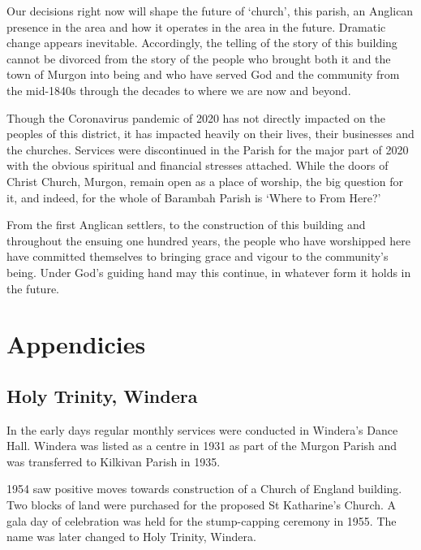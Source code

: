 Our decisions right now will shape the future of `church', this parish, an Anglican presence in the area and how it operates in the area in the future. Dramatic change appears inevitable. Accordingly, the telling of the story of this building cannot be divorced from the story of the people who brought both it and the town of Murgon into being and who have served God and the community from the mid-1840s through the decades to where we are now and beyond.



Though the Coronavirus pandemic of 2020 has not directly impacted on the peoples of this district, it has impacted heavily on their lives, their businesses and the churches. Services were discontinued in the Parish for the major part of 2020 with the obvious spiritual and financial stresses attached. While the doors of Christ Church, Murgon, remain open as a place of worship, the big question for it, and indeed, for the whole of Barambah Parish is `Where to From Here?'



From the first Anglican settlers, to the construction of this building and throughout the ensuing one hundred years, the people who have worshipped here have committed themselves to bringing grace and vigour to the community's being. Under God's guiding hand may this continue, in whatever form it holds in the future.

\balance


\backmatter
\chapter{Appendicies}
\nobalance


\section{Holy Trinity, Windera}



In the early days regular monthly services were conducted in Windera's Dance Hall. Windera was listed as a centre in 1931 as part of the Murgon Parish and was transferred to Kilkivan Parish in 1935.



1954 saw positive moves towards construction of a Church of England building. Two blocks of land were purchased for the proposed St Katharine's Church. A gala day of celebration was held for the stump-capping ceremony in 1955. The name was later changed to Holy Trinity, Windera.



